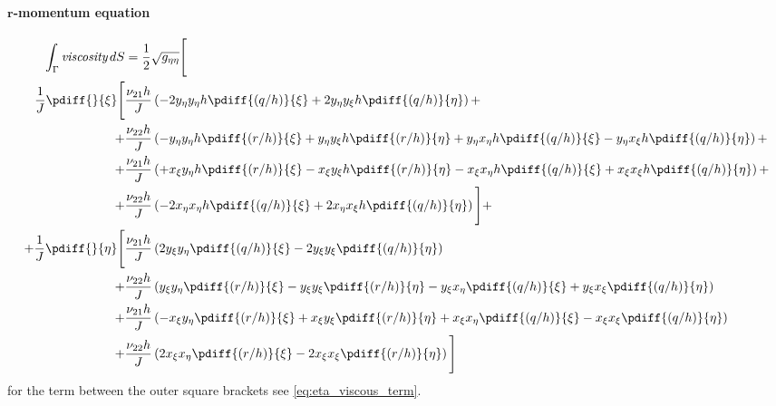 \paragraph*{$\bm r$-momentum equation}
\vspace{-1\baselineskip}
\begin{align}
\int_\Gamma \textit{viscosity} \, dS & = \half \sqrt{g_{\eta\eta}} \Bigg[
\\*
\frac{1}{J} \pdiff{}{\xi} \Bigg[ &
\frac{\nu_{21} h}{J} \left(
- 2 y_{\eta} y_{\eta} h\pdiff{(q/h)}{\xi}
+ 2 y_{\eta} y_{\xi} h\pdiff{(q/h)}{\eta}
\right)
+
\\
+ &\frac{\nu_{22} h}{J} \left(
- y_{\eta} y_{\eta} h \pdiff{(r/h)}{\xi}
+ y_{\eta} y_{\xi} h \pdiff{(r/h)}{\eta}
+ y_{\eta} x_{\eta} h \pdiff{(q/h)}{\xi}
- y_{\eta} x_{\xi} h \pdiff{(q/h)}{\eta}
\right)
+
\\
+ &\frac{\nu_{21} h}{J} \left(
+ x_{\xi} y_{\eta} h \pdiff{(r/h)}{\xi}
- x_{\xi} y_{\xi} h \pdiff{(r/h)}{\eta}
- x_{\xi} x_{\eta} h \pdiff{(q/h)}{\xi}
+ x_{\xi} x_{\xi} h \pdiff{(q/h)}{\eta}
\right)
+
\\
+ &\frac{\nu_{22} h}{J} \left(
- 2 x_{\eta} x_{\eta} h\pdiff{(q/h)}{\xi}
+ 2 x_{\eta} x_{\xi} h\pdiff{(q/h)}{\eta}
\right)
\Bigg] +
\\
+ \frac{1}{J} \pdiff{}{\eta}\Bigg[ &
\frac{\nu_{21} h}{J} \left(
2 y_{\xi} y_{\eta} \pdiff{(q/h)}{\xi}
- 2 y_{\xi} y_{\xi} \pdiff{(q/h)}{\eta}
\right)
\\* + &
\frac{\nu_{22} h}{J} \left(
y_{\xi}y_{\eta} \pdiff{(r/h)}{\xi}
- y_{\xi}y_{\xi} \pdiff{(r/h)}{\eta}
- y_{\xi}x_{\eta} \pdiff{(q/h)}{\xi}
+ y_{\xi}x_{\xi} \pdiff{(q/h)}{\eta}
\right)
\\* + &
\frac{\nu_{21} h}{J} \left(
- x_{\xi}y_{\eta} \pdiff{(r/h)}{\xi}
+ x_{\xi}y_{\xi} \pdiff{(r/h)}{\eta}
+ x_{\xi}x_{\eta} \pdiff{(q/h)}{\xi}
- x_{\xi}x_{\xi} \pdiff{(q/h)}{\eta}
\right)
\\* + &
\frac{\nu_{22} h}{J} \left(
2 x_{\xi}x_{\eta} \pdiff{(r/h)}{\xi}
- 2 x_{\xi}x_{\xi} \pdiff{(r/h)}{\eta}
\right)
\Bigg]
\end{align}
for the term between the outer square brackets see \autoref{eq:eta_viscous_term}.
